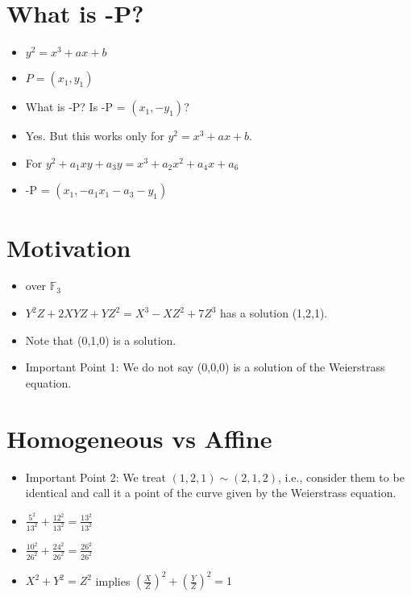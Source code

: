 \section*{What is -P?}

\begin{itemize}
	\item \( y^2 = x^3 + ax + b \)
	\item \( P = (x_1, y_1) \)
	\item What is -P? Is -P = \( (x_1, -y_1) \)?
	\item Yes. But this works only for \( y^2 = x^3 + ax + b \).
	\item For \( y^2 + a_1xy + a_3y = x^3 + a_2x^2 + a_4x + a_6 \)
	\item -P = \( (x_1, -a_1x_1 - a_3 - y_1) \)
\end{itemize}

\section*{Motivation}

\begin{itemize}
	\item over \( \mathbb{F}_3 \)
	\item \( Y^2Z + 2XYZ + YZ^2 = X^3 - XZ^2 + 7Z^3 \) has a solution (1,2,1).
	\item Note that (0,1,0) is a solution.
	\item Important Point 1: We do not say (0,0,0) is a solution of the Weierstrass equation.
\end{itemize}

\section*{Homogeneous vs Affine}

\begin{itemize}
	\item Important Point 2: We treat \( (1,2,1) \sim (2,1,2) \), i.e., consider them to be identical and call it a point of the curve given by the Weierstrass equation.
	\item \( \frac{5^2}{13^2} + \frac{12^2}{13^2} = \frac{13^2}{13^2} \)
	\item \( \frac{10^2}{26^2} + \frac{24^2}{26^2} = \frac{26^2}{26^2} \)
	\item \( X^2 + Y^2 = Z^2 \) implies \( \left( \frac{X}{Z} \right)^2 + \left( \frac{Y}{Z} \right)^2 = 1 \)
\end{itemize}

